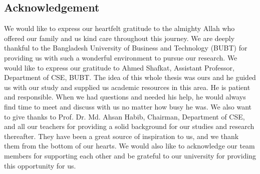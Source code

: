 \begin{center}
    \section*{Acknowledgement}
\end{center}
\large We would like to express our heartfelt gratitude to the almighty Allah who offered our family and us kind care throughout this journey. We are deeply thankful to the Bangladesh University of Business and Technology (BUBT) for providing us with such a wonderful environment to pursue our research. We would like to express our  gratitude to Ahmed Shafkat, Assistant Professor, Department of CSE, BUBT. The idea of this whole thesis was ours and he guided us with our study and supplied us academic resources in this area. He is patient and responsible. When we had questions and needed his help, he  would always find time to meet and discuss with us no matter how busy he was. We also want to give thanks to Prof. Dr. Md. Ahsan Habib, Chairman, Department of CSE, and all our teachers for providing a solid background for our studies and research thereafter. They have been a great source of inspiration to us, and we thank them from the bottom of our hearts. We would also like to acknowledge our team members for supporting each other and be grateful to our university for providing this opportunity for us.